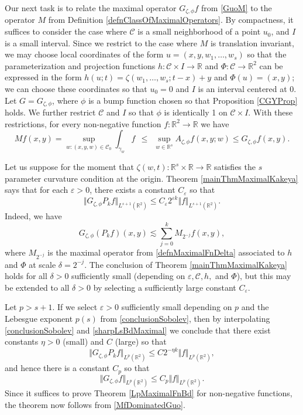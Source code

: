 \documentclass[letterpaper, reqno,11pt]{article}
\numberwithin{equation}{section}
\newcommand{\RR}{\mathbb{R}}
\newcommand{\eps}{\varepsilon}
\numberwithin{thm}{section}
\theoremstyle{remark}
\begin{document}
Our next task is to relate the maximal operator $G_{\zeta,\phi}f$ from \eqref{GuoM} to the operator $M$ from Definition \ref{defnClassOfMaximalOperators}. By compactness, it suffices to consider the case where $\mathcal{C}$ is a small neighborhood of a point $u_0$, and $I$ is a small interval. Since we restrict to the case where $M$ is translation invariant, we may choose local coordinates of the form $u=(x,y,w_1,\ldots,w_s)$ so that the parameterization and projection functions $h\colon  \mathcal{C}\times I\to\RR$ and $\Phi\colon \mathcal{C} \to\RR^{2}$ can be expressed in the form $h(u; t) = \zeta(w_1,\ldots,w_s; t-x) + y$ and  $\Phi(u) = (x,y)$; we can choose these coordinates so that $u_0 = 0$ and $I$ is an interval centered at 0. Let $G = G_{\zeta,\phi}$, where $\phi$ is a bump function chosen so that Proposition \ref{CGYProp} holds. We further restrict $\mathcal{C}$ and $I$ so that $\phi$ is identically 1 on $\mathcal{C}\times I$. With these restrictions, for every non-negative function $f\colon\RR^2\to\RR$ we have
\begin{equation}\label{MfDominatedGuo}
Mf(x,y) = \sup_{w\colon (x,y,w)\in\mathcal{C}_0}\int_{\gamma_w}f\ \  \leq\ \ \sup_{w\in\RR^s}A_{\zeta,\phi}f(x,y; w)\leq G_{\zeta,\phi}f(x,y).
\end{equation}
 

Let us suppose for the moment that $\zeta(w,t)\colon \RR^s\times\RR\to\RR$ satisfies the $s$ parameter curvature condition at the origin. Theorem \ref{mainThmMaximalKakeya} says that for each $\eps>0$, there exists a constant $C_\eps$ so that
\begin{equation}\label{sharpLsBdMaximal}
\Vert G_{\zeta,\phi}P_kf \Vert_{L^{s+1}(\RR^2)}\leq C_\eps 2^{\eps k}\Vert f \Vert_{L^{s+1}(\RR^2)}.
\end{equation}
Indeed, we have
\begin{equation}
G_{\zeta,\phi}(P_kf)(x,y) \lesssim \sum_{j=0}^k M_{2^{-j}}f(x,y),
\end{equation}
where $M_{2^{-j}}$ is the maximal operator from \eqref{defnMaximalFnDelta} associated to $h$ and $\Phi$ at scale $\delta=2^{-j}$. The conclusion of Theorem \ref{mainThmMaximalKakeya} holds for all $\delta>0$ sufficiently small (depending on $\eps, \mathcal{C}, h,$ and $\Phi$), but this may be extended to all $\delta>0$ by selecting a sufficiently large constant $C_\eps$.

Let $p>s+1$. If we select $\eps>0$ sufficiently small depending on $p$ and the Lebesgue exponent $p(s)$ from \eqref{conclusionSobolev}, then by interpolating \eqref{conclusionSobolev} and \eqref{sharpLsBdMaximal} we conclude that there exist constants $\eta>0$ (small) and $C$ (large) so that
\[
\Vert G_{\zeta,\phi}P_kf \Vert_{L^{p}(\RR^2)}\leq C 2^{-\eta k}\Vert f \Vert_{L^p(\RR^2)},
\]
and hence there is a constant $C_p$ so that
\begin{equation}\label{LpBdChi}
\Vert G_{\zeta,\phi}f \Vert_{L^{p}(\RR^2)}\leq C_p \Vert f \Vert_{L^p(\RR^2)}.
\end{equation}
Since it suffices to prove Theorem \ref{LpMaximalFnBd} for non-negative functions, the theorem now follows from \eqref{MfDominatedGuo}.
\end{document}
